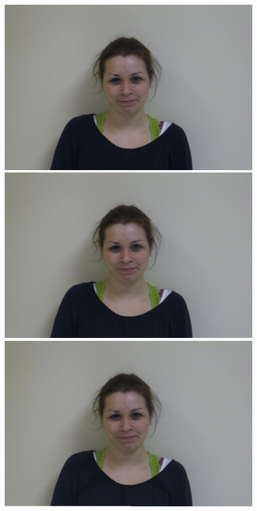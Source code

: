 \documentclass[11pt]{article}
\begin{document}
\begin{figure}[H]
\begin{center}

\includegraphics[scale=0.06]{figs/frames/morph_steinkirch_tangatur_01.jpg}  
\includegraphics[scale=0.06]{figs/frames/morph_steinkirch_tangatur_02.jpg} 
\includegraphics[scale=0.06]{figs/frames/morph_steinkirch_tangatur_03.jpg} 

\end{center}
\end{figure}
\end{document}
